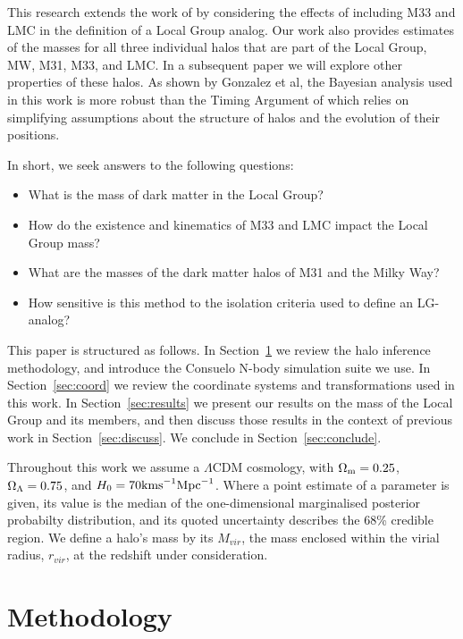 \documentclass[iop,apj,twocolappendix,numberedappendix]{emulateapj}
\newcommand{\LCDM}{$\Lambda$CDM }
\newcommand{\Mpc}{{\rm Mpc}}
\newcommand{\kms}{{\rm km s}^{-1}}
\newcommand{\consuelo}{{\sc Consuelo }}
\def\Sref#1{Section~\ref{#1}}
\begin{document}
This research extends the work of \cite{gonzalez2014mass} by considering the effects of including M33 and LMC in the definition of a Local Group analog. Our work also provides estimates of the masses for all three individual halos that are part of the Local Group, MW, M31, M33, and LMC. In a subsequent
paper we will explore other properties of these halos. As shown by Gonzalez et al, the Bayesian analysis used in this work is more robust than the Timing Argument of \cite{Timing} which relies on simplifying assumptions about the structure of halos and the evolution of their positions.

In short, we seek answers to the following questions:
\begin{itemize}
\item What is the mass of dark matter in the Local Group?
\item How do the existence and kinematics of M33 and LMC impact the Local Group mass?
\item What are the masses of the dark matter halos of M31 and the Milky
Way?
\item How sensitive is this method to the isolation criteria used to define an LG-analog?
\end{itemize}

This paper is structured as follows.  In 
\Sref{sec:method} 
we review the
halo inference methodology, and introduce the \consuelo N-body
simulation suite we use. In 
\Sref{sec:coord} 
we review the coordinate systems and transformations used in this work. In 
\Sref{sec:results} 
we present
our results on the mass of the Local Group and its members, and then
discuss those results in the context of previous work in
\Sref{sec:discuss}. 
We conclude in 
\Sref{sec:conclude}.

Throughout this work we assume a \LCDM cosmology, with $\Omega_{\rm m} =
0.25$, $\Omega_{\rm \Lambda} = 0.75$, and $H_0 = 70 \kms \Mpc^{-1}$. Where
a point estimate of a parameter is given, its value is the median of the
one-dimensional marginalised posterior probabilty distribution, and its
quoted uncertainty describes the 68\% credible region.
We define a halo's mass by its $M_{vir}$, the mass enclosed within the virial radius, $r_{vir}$,
at the redshift under consideration.


\section{Methodology}
\label{sec:method}
\end{document}

